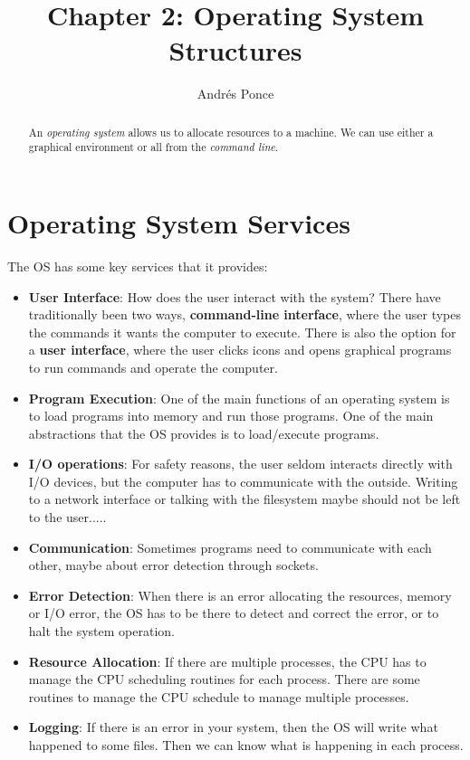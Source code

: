 \documentclass{tufte-handout}
\title{Chapter 2: Operating System Structures}
\author{Andr\'es Ponce}
\begin{document}
\maketitle
\begin{abstract}
	An \textit{operating system} allows us to allocate resources
	to a machine. We can use either a graphical environment or 
	all from the \textit{command line}.
\end{abstract}


\section{Operating System Services}
The OS has some key services that it provides:

\begin{itemize}
	\item \textbf{User Interface}: How does the user interact with the system? There 
			have traditionally been two ways, \textbf{command-line interface}, where the 
			user types the commands it wants the computer to execute. There is also the 
			option for a \textbf{user interface}, where the user clicks icons and opens
			graphical programs to run commands and operate the computer.

	\item \textbf{Program Execution}: One of the main functions of an operating system 
			is to load programs into memory and run those programs. One of the main 
			abstractions that the OS provides is to load/execute programs.

	\item \textbf{I/O operations}: For safety reasons, the user seldom interacts directly
			with I/O devices, but the computer has to communicate with the outside. 
			Writing to a network interface or talking with the filesystem maybe should 
			not be left to the user.....

	\item \textbf{Communication}: Sometimes programs need to communicate with each other,
			maybe about error detection through sockets.

	\item \textbf{Error Detection}: When there is an error allocating the resources,
			memory or I/O error, the OS has to be there to detect and correct the error,
			or to halt the system operation.
	\item \textbf{Resource Allocation}: If there are multiple processes, the CPU has 
			to manage the CPU scheduling routines for each process. There are some
			routines to manage the CPU schedule to manage multiple processes.
	\item \textbf{Logging}: If there is an error in your system, then the OS will
			write what happened to some files. Then we can know what is happening 
			in each process.
\end{itemize}
\end{document}
